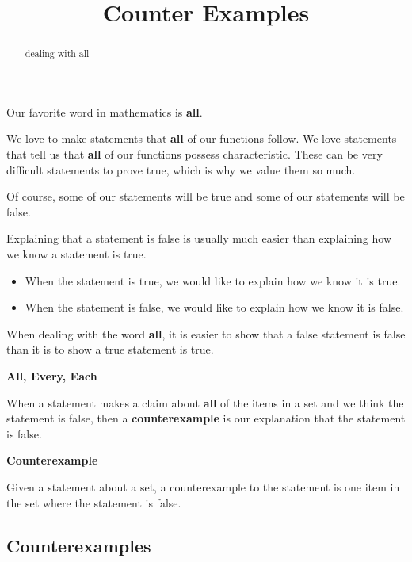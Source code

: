 \documentclass{ximera}
\title{Counter Examples}
\begin{document}
\begin{abstract}
dealing with all
\end{abstract}
\maketitle




Our favorite word in mathematics is \textbf{\textcolor{red!70!black}{all}}. 


We love to make statements that \textbf{all} of our functions follow. We love statements that tell us that \textbf{all} of our functions possess characteristic. These can be very difficult statements to prove true, which is why we value them so much. 


Of course, some of our statements will be true and some of our statements will be false.

Explaining that a statement is false is usually much easier than explaining how we know a statement is true.

\begin{itemize}
\item When the statement is true, we would like to explain how we know it is true.
\item When the statement is false, we would like to explain how we know it is false.
\end{itemize}



When dealing with the word \textbf{all}, it is easier to show that a false statement is false than it is to show a true statement is true. 


\textbf{\textcolor{blue!55!black}{All, Every, Each}} 

When a statement makes a claim about \textbf{\textcolor{red!70!black}{all}} of the items in a set and we think the statement is false, then a \textbf{counterexample} is our explanation that the statement is false.



\begin{definition}  \textbf{\textcolor{green!50!black}{Counterexample}} 

Given a statement about a set, a counterexample to the statement is one item in the set where the statement is false.

\end{definition}




\subsection*{Counterexamples}
\end{document}

